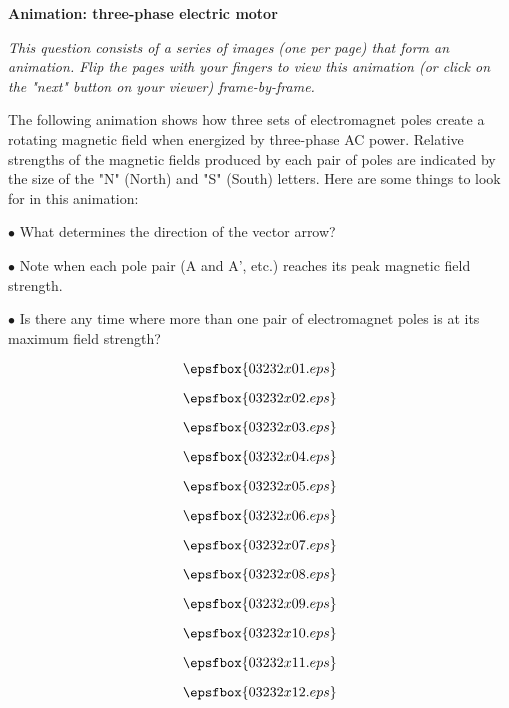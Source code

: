 

\centerline{\bf Animation: three-phase electric motor}

\vskip 10pt

{\it This question consists of a series of images (one per page) that form an animation.  Flip the pages with your fingers to view this animation (or click on the "next" button on your viewer) frame-by-frame.}

\vskip 10pt

The following animation shows how three sets of electromagnet poles create a rotating magnetic field when energized by three-phase AC power.  Relative strengths of the magnetic fields produced by each pair of poles are indicated by the size of the "N" (North) and "S" (South) letters.  Here are some things to look for in this animation:

\medskip
\goodbreak
\item{$\bullet$} What determines the direction of the vector arrow?
\item{$\bullet$} Note when each pole pair (A and A', etc.) reaches its peak magnetic field strength.
\item{$\bullet$} Is there any time where more than one pair of electromagnet poles is at its maximum field strength?
\medskip

\vfil \eject
$$\epsfbox{03232x01.eps}$$

\vfil \eject
$$\epsfbox{03232x02.eps}$$

\vfil \eject
$$\epsfbox{03232x03.eps}$$

\vfil \eject
$$\epsfbox{03232x04.eps}$$

\vfil \eject
$$\epsfbox{03232x05.eps}$$

\vfil \eject
$$\epsfbox{03232x06.eps}$$

\vfil \eject
$$\epsfbox{03232x07.eps}$$

\vfil \eject
$$\epsfbox{03232x08.eps}$$

\vfil \eject
$$\epsfbox{03232x09.eps}$$

\vfil \eject
$$\epsfbox{03232x10.eps}$$

\vfil \eject
$$\epsfbox{03232x11.eps}$$

\vfil \eject
$$\epsfbox{03232x12.eps}$$


